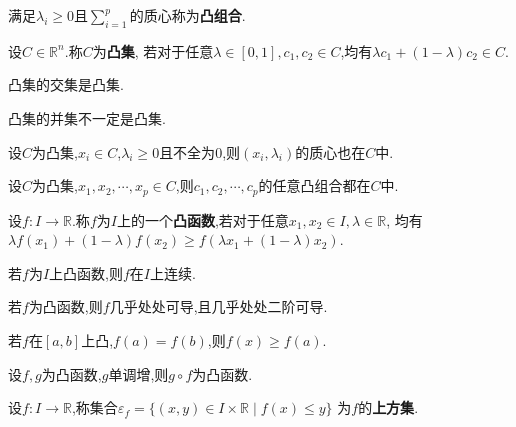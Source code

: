 \begin{deff}
    满足$\lambda_i \geqslant 0$且$\sum\limits_{i=1}^p$的质心称为\textbf{凸组合}.
\end{deff}

\begin{deff}
    设$C\in\mathbb{R}^n$.称$C$为\textbf{凸集},
    若对于任意$\lambda\in[0,1],c_1,c_2\in C$,均有$\lambda c_1+(1-\lambda)c_2 \in C$.
\end{deff}

\begin{prop}
    凸集的交集是凸集.
\end{prop}

\begin{rqq}
    凸集的并集不一定是凸集.
\end{rqq}

\begin{prop}
    设$C$为凸集,$x_i\in C$,$\lambda_i\geqslant0$且不全为$0$,则$(x_i,\lambda_i)$的质心也在$C$中.
\end{prop}

\begin{prop}
    设$C$为凸集,$x_1,x_2,\cdots,x_p\in C$,则$c_1,c_2,\cdots,c_p$的任意凸组合都在$C$中.
\end{prop}

\begin{deff}
    设$f:I\to\mathbb{R}$.称$f$为$I$上的一个\textbf{凸函数},若对于任意$x_1,x_2\in I,\lambda\in\mathbb{R}$,
    均有$\lambda f(x_1)+(1-\lambda)f(x_2)\geqslant f(\lambda x_1+(1-\lambda)x_2)$.
\end{deff}

\begin{thm}
    若$f$为$I$上凸函数,则$f$在$I$上连续.
\end{thm}

\begin{thm}[Alexandrov]
    若$f$为凸函数,则$f$几乎处处可导,且几乎处处二阶可导.
\end{thm}

\begin{prop}
    若$f$在$[a,b]$上凸,$f(a)=f(b)$,则$f(x)\geqslant f(a)$.
\end{prop}

\begin{prop}
    设$f,g$为凸函数,$g$单调增,则$g\circ f$为凸函数.
\end{prop}

\begin{deff}
    设$f:I\to\mathbb{R}$,称集合$\varepsilon_f=\{(x,y)\in I\times\mathbb{R}\mid f(x)\leqslant y\}$
    为$f$的\textbf{上方集}.
\end{deff}

